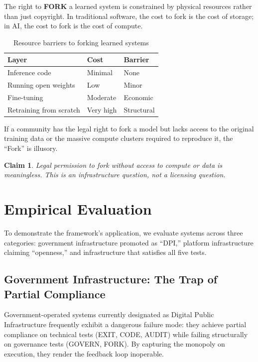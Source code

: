 \documentclass{article}
\newtheorem{claim}{Claim}
\begin{document}
The right to \textbf{FORK} a learned system is constrained by physical resources rather than just copyright. In traditional software, the cost to fork is the cost of storage; in AI, the cost to fork is the cost of compute.

\begin{table}[htbp]
\centering
\begin{tabular}{@{}lll@{}}
\toprule
\textbf{Layer} & \textbf{Cost} & \textbf{Barrier} \\
\midrule
Inference code & Minimal & None \\
Running open weights & Low & Minor \\
Fine-tuning & Moderate & Economic \\
Retraining from scratch & Very high & Structural \\
\bottomrule
\end{tabular}
\caption{Resource barriers to forking learned systems}
\end{table}

If a community has the legal right to fork a model but lacks access to the original training data or the massive compute clusters required to reproduce it, the ``Fork'' is illusory.

\begin{claim}
Legal permission to fork without access to compute or data is meaningless. This is an infrastructure question, not a licensing question.
\end{claim}

\section{Empirical Evaluation}

To demonstrate the framework's application, we evaluate systems across three categories: government infrastructure promoted as ``DPI,'' platform infrastructure claiming ``openness,'' and infrastructure that satisfies all five tests.

\subsection{Government Infrastructure: The Trap of Partial Compliance}

Government-operated systems currently designated as Digital Public Infrastructure frequently exhibit a dangerous failure mode: they achieve partial compliance on technical tests (EXIT, CODE, AUDIT) while failing structurally on governance tests (GOVERN, FORK). By capturing the monopoly on execution, they render the feedback loop inoperable.
\end{document}
